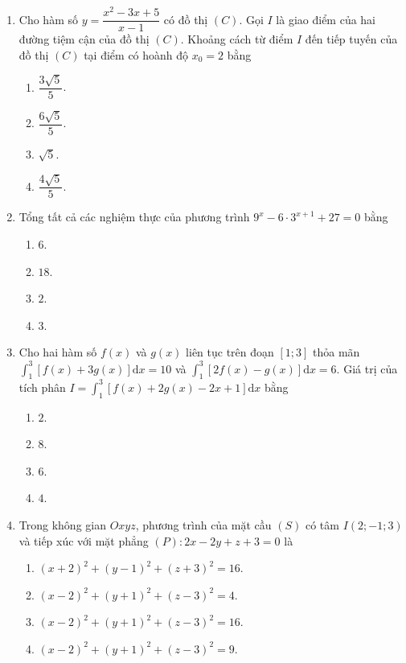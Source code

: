 \documentclass[12pt,a4paper]{article}
\begin{document}
\begin{enumerate}[label=\textbf{Câu \arabic*:}, leftmargin=*]

\item Cho hàm số $y = \dfrac{x^2 - 3x + 5}{x - 1}$ có đồ thị $(C)$. Gọi $I$ là giao điểm của hai đường tiệm cận của đồ thị $(C)$. Khoảng cách từ điểm $I$ đến tiếp tuyến của đồ thị $(C)$ tại điểm có hoành độ $x_0 = 2$ bằng
\begin{enumerate}[label=\Alph*.]
    \item $\dfrac{3\sqrt{5}}{5}$.
    \item $\dfrac{6\sqrt{5}}{5}$.
    \item $\sqrt{5}$.
    \item $\dfrac{4\sqrt{5}}{5}$.
\end{enumerate}

\item Tổng tất cả các nghiệm thực của phương trình $9^x - 6\cdot 3^{x+1} + 27 = 0$ bằng
\begin{enumerate}[label=\Alph*.]
    \item $6$.
    \item $18$.
    \item $2$.
    \item $3$.
\end{enumerate}

\item Cho hai hàm số $f(x)$ và $g(x)$ liên tục trên đoạn $[1; 3]$ thỏa mãn $\displaystyle\int_{1}^{3} \left[f(x) + 3g(x)\right]\mathrm{d}x = 10$ và $\displaystyle\int_{1}^{3} \left[2f(x) - g(x)\right]\mathrm{d}x = 6$. Giá trị của tích phân $I = \displaystyle\int_{1}^{3} \left[f(x) + 2g(x) - 2x + 1\right]\mathrm{d}x$ bằng
\begin{enumerate}[label=\Alph*.]
    \item $2$.
    \item $8$.
    \item $6$.
    \item $4$.
\end{enumerate}

\item Trong không gian $Oxyz$, phương trình của mặt cầu $(S)$ có tâm $I(2; -1; 3)$ và tiếp xúc với mặt phẳng $(P): 2x - 2y + z + 3 = 0$ là
\begin{enumerate}[label=\Alph*.]
    \item $(x + 2)^2 + (y - 1)^2 + (z + 3)^2 = 16$.
    \item $(x - 2)^2 + (y + 1)^2 + (z - 3)^2 = 4$.
    \item $(x - 2)^2 + (y + 1)^2 + (z - 3)^2 = 16$.
    \item $(x - 2)^2 + (y + 1)^2 + (z - 3)^2 = 9$.
\end{enumerate}


\end{enumerate}
\end{document}
